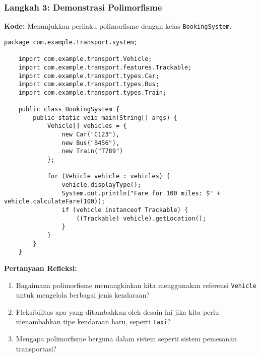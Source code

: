 \subsubsection{Langkah 3: Demonstrasi Polimorfisme}

\textbf{Kode:} Menunjukkan perilaku polimorfisme dengan kelas \texttt{BookingSystem}.

\begin{lstlisting}[style=JavaStyle, caption={BookingSystem.java}]
	package com.example.transport.system;
	
	import com.example.transport.Vehicle;
	import com.example.transport.features.Trackable;
	import com.example.transport.types.Car;
	import com.example.transport.types.Bus;
	import com.example.transport.types.Train;
	
	public class BookingSystem {
		public static void main(String[] args) {
			Vehicle[] vehicles = {
				new Car("C123"),
				new Bus("B456"),
				new Train("T789")
			};
			
			for (Vehicle vehicle : vehicles) {
				vehicle.displayType();
				System.out.println("Fare for 100 miles: $" + vehicle.calculateFare(100));
				if (vehicle instanceof Trackable) {
					((Trackable) vehicle).getLocation();
				}
			}
		}
	}
\end{lstlisting}

\textbf{Pertanyaan Refleksi:}
\begin{enumerate}
	\item Bagaimana polimorfisme memungkinkan kita menggunakan referensi \texttt{Vehicle} untuk mengelola berbagai jenis kendaraan?
	\begin{tcolorbox}[colback=white, colframe=black,  width=\linewidth, height=3cm, boxrule=1pt, sharp corners]
	\end{tcolorbox}
	\item Fleksibilitas apa yang ditambahkan oleh desain ini jika kita perlu menambahkan tipe kendaraan baru, seperti \texttt{Taxi}?
	\begin{tcolorbox}[colback=white, colframe=black,  width=\linewidth, height=3cm, boxrule=1pt, sharp corners]
	\end{tcolorbox}
	\item Mengapa polimorfisme berguna dalam sistem seperti sistem pemesanan transportasi?
	\begin{tcolorbox}[colback=white, colframe=black,  width=\linewidth, height=3cm, boxrule=1pt, sharp corners]
	\end{tcolorbox}
\end{enumerate}

